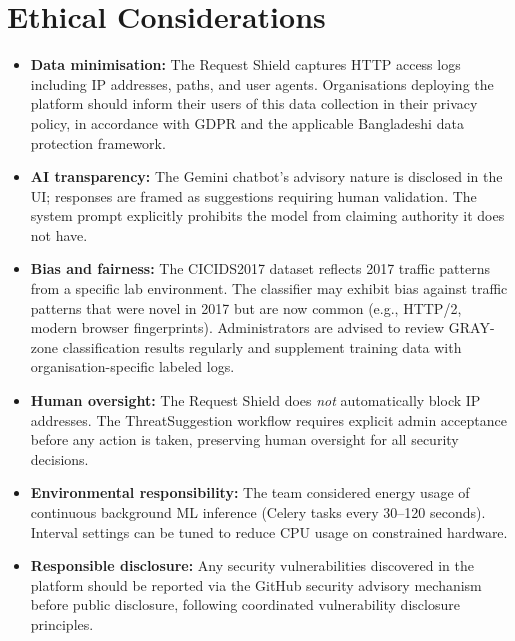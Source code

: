\section{Ethical Considerations}

\begin{itemize}
  \item \textbf{Data minimisation:} The Request Shield captures HTTP access
        logs including IP addresses, paths, and user agents.  Organisations
        deploying the platform should inform their users of this data
        collection in their privacy policy, in accordance with GDPR and the
        applicable Bangladeshi data protection framework.

  \item \textbf{AI transparency:} The Gemini chatbot's advisory nature is
        disclosed in the UI; responses are framed as suggestions requiring
        human validation.  The system prompt explicitly prohibits the model
        from claiming authority it does not have.

  \item \textbf{Bias and fairness:} The CICIDS2017 dataset reflects 2017
        traffic patterns from a specific lab environment.  The classifier
        may exhibit bias against traffic patterns that were novel in 2017
        but are now common (e.g., HTTP/2, modern browser fingerprints).
        Administrators are advised to review GRAY-zone classification results
        regularly and supplement training data with organisation-specific
        labeled logs.

  \item \textbf{Human oversight:} The Request Shield does \textit{not}
        automatically block IP addresses.  The ThreatSuggestion workflow
        requires explicit admin acceptance before any action is taken,
        preserving human oversight for all security decisions.

  \item \textbf{Environmental responsibility:} The team considered energy
        usage of continuous background ML inference (Celery tasks every
        30--120 seconds).  Interval settings can be tuned to reduce CPU
        usage on constrained hardware.

  \item \textbf{Responsible disclosure:} Any security vulnerabilities
        discovered in the platform should be reported via the GitHub security
        advisory mechanism before public disclosure, following coordinated
        vulnerability disclosure principles.
\end{itemize}

